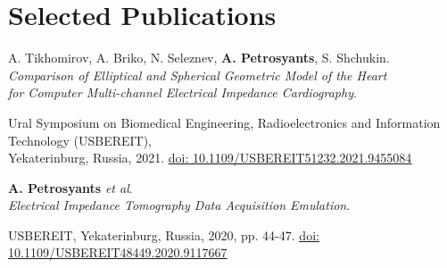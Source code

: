 \section{Selected Publications}
\resumeSubHeadingListStart

\resumeProjectHeading
  {A. Tikhomirov, A. Briko, N. Seleznev, \textbf{A. Petrosyants}, S. Shchukin.\\
  \textit{Comparison of Elliptical and Spherical Geometric
  Model of the Heart}\\
  \textit{for Computer Multi-channel Electrical Impedance Cardiography}.}{}
      \begin{itemize}[leftmargin=0in, label={}]
        \small{\item{
          {Ural Symposium on Biomedical Engineering, Radioelectronics and Information Technology (USBEREIT), \\ 
          Yekaterinburg, Russia, 2021.}
        {\href{https://ieeexplore.ieee.org/document/9455084/}{\underline{doi: 10.1109/USBEREIT51232.2021.9455084}}}
        }}
      \end{itemize}

\resumeProjectHeading
    {\textbf{A. Petrosyants} \textit{et al}.\\
  \textit{Electrical Impedance Tomography Data Acquisition Emulation}.}{}
      \begin{itemize}[leftmargin=0in, label={}]
      \small{\item{
        {USBEREIT, Yekaterinburg, Russia, 2020, pp. 44-47.}
        {\href{https://ieeexplore.ieee.org/abstract/document/9117667/}{\underline{doi: 10.1109/USBEREIT48449.2020.9117667}}}
      }}
      \end{itemize}
\resumeSubHeadingListEnd